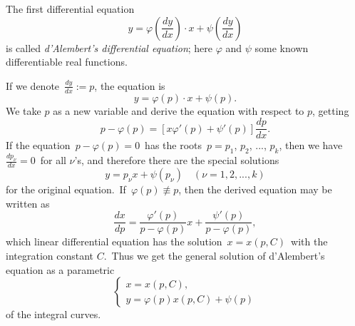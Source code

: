 \documentclass[12pt]{article}
\begin{document}
The first  differential equation
          $$y = \varphi(\frac{dy}{dx})\cdot x+\psi(\frac{dy}{dx})$$
is called {\em d'Alembert's differential equation}; here $\varphi$ and $\psi$  some known differentiable real functions.

If we denote \,$\frac{dy}{dx} := p$, the equation is
                      $$y = \varphi(p)\cdot x+\psi(p).$$
We take $p$ as a new variable and derive the equation with respect to $p$, getting
           $$p-\varphi(p) = [x\varphi'(p)+\psi'(p)]\frac{dp}{dx}.$$
If the equation \,$p-\varphi(p) = 0$\, has the roots \,$p = p_1$, $p_2$, ..., $p_k$, then we have \,$\frac{dp_{\nu}}{dx} = 0$\, for all $\nu$'s, and therefore there are the special solutions 
                $$y = p_{\nu}x+\psi(p_{\nu}) \quad (\nu = 1, 2, ..., k)$$
for the original equation. \,If  \,$\varphi(p) \not\equiv p$, then the derived equation may be written as
 $$\frac{dx}{dp} = \frac{\varphi'(p)}{p-\varphi(p)}x+\frac{\psi'(p)}{p-\varphi(p)},$$
which linear differential equation has the solution \,$x = x(p, C)$\, with the integration constant $C$. \,Thus we get the general solution of d'Alembert's equation as a parametric 
\[\begin{cases}       
        x = x(p, C),\\
        y = \varphi(p)x(p, C)+\psi(p)
\end{cases}\]
of the integral curves.
\end{document}
